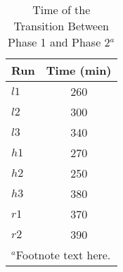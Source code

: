 \documentclass[draft]{agujournal2019}
\begin{document}
%
%
 \begin{table}
 \caption{Time of the Transition Between Phase 1 and Phase 2$^{a}$}
 \centering
 \begin{tabular}{l c}
 \hline
  Run  & Time (min)  \\
 \hline
   $l1$  & 260   \\
   $l2$  & 300   \\
   $l3$  & 340   \\
   $h1$  & 270   \\
   $h2$  & 250   \\
   $h3$  & 380   \\
   $r1$  & 370   \\
   $r2$  & 390   \\
 \hline
 \multicolumn{2}{l}{$^{a}$Footnote text here.}
 \end{tabular}
 \end{table}

%
%



%
%
%
%
\end{document}
